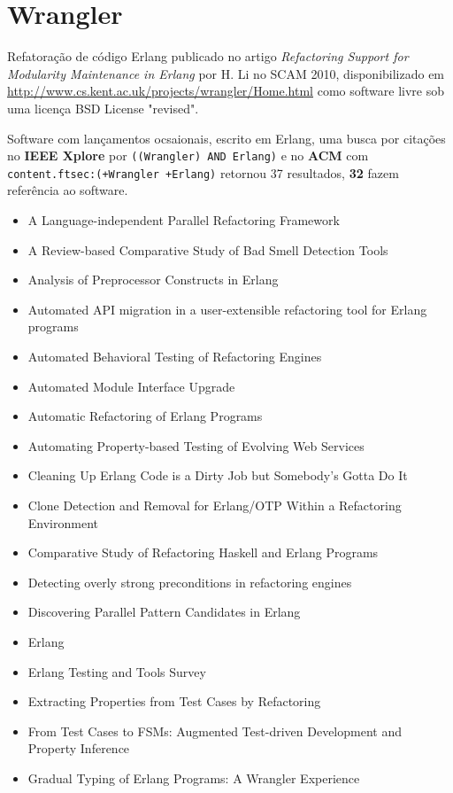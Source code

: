 \section{Wrangler}

Refatoração de código Erlang
publicado no artigo {\it Refactoring Support for Modularity Maintenance in Erlang}
por H. Li
no SCAM 2010,
disponibilizado em \url{http://www.cs.kent.ac.uk/projects/wrangler/Home.html}
como software livre
sob uma licença BSD License "revised".

Software com lançamentos ocsaionais,
escrito em Erlang,
uma busca por citações no {\bf IEEE Xplore} por
\texttt{((Wrangler) AND Erlang)}
e no {\bf ACM} com
\texttt{content.ftsec:(+Wrangler +Erlang)}
retornou
37 resultados,
{\bf 32} fazem referência ao software.

\begin{itemize}
\item A Language-independent Parallel Refactoring Framework
\item A Review-based Comparative Study of Bad Smell Detection Tools
\item Analysis of Preprocessor Constructs in Erlang
\item Automated API migration in a user-extensible refactoring tool for Erlang programs
\item Automated Behavioral Testing of Refactoring Engines
\item Automated Module Interface Upgrade
\item Automatic Refactoring of Erlang Programs
\item Automating Property-based Testing of Evolving Web Services
\item Cleaning Up Erlang Code is a Dirty Job but Somebody's Gotta Do It
\item Clone Detection and Removal for Erlang/OTP Within a Refactoring Environment
\item Comparative Study of Refactoring Haskell and Erlang Programs
\item Detecting overly strong preconditions in refactoring engines
\item Discovering Parallel Pattern Candidates in Erlang
\item Erlang
\item Erlang Testing and Tools Survey
\item Extracting Properties from Test Cases by Refactoring
\item From Test Cases to FSMs: Augmented Test-driven Development and Property Inference
\item Gradual Typing of Erlang Programs: A Wrangler Experience

\end{itemize}

